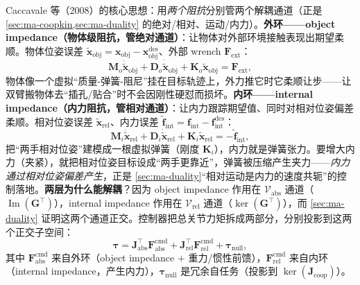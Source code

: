 Caccavale 等（2008）的核心思想\cite{caccavale2008sixdof}：用\emph{两个阻抗}分别管两个解耦通道（正是 \cref{sec:ma-coopkin,sec:ma-duality} 的绝对/相对、运动/内力）。\textbf{外环——object impedance（物体级阻抗，管绝对通道）}：让物体对外部环境接触表现出期望柔顺。物体位姿误差 $\tilde{\mathbf{x}}_{\text{obj}}=\mathbf{x}_{\text{obj}}-\mathbf{x}_{\text{obj}}^{\text{des}}$、外部 wrench $\mathbf{F}_{\text{ext}}$：
\begin{equation}
  \mathbf{M}_o\ddot{\tilde{\mathbf{x}}}_{\text{obj}}+\mathbf{D}_o\dot{\tilde{\mathbf{x}}}_{\text{obj}}+\mathbf{K}_o\tilde{\mathbf{x}}_{\text{obj}}=\mathbf{F}_{\text{ext}},
  \label{eq:ma-objimp}
\end{equation}
物体像一个虚拟“质量-弹簧-阻尼”挂在目标轨迹上，外力推它时它柔顺让步——让双臂搬物体去“插孔/贴合”时不会因刚性硬怼而损坏。\textbf{内环——internal impedance（内力阻抗，管相对通道）}：让内力跟踪期望值、同时对相对位姿偏差柔顺。相对位姿误差 $\tilde{\mathbf{x}}_{\text{rel}}$、内力误差 $\tilde{\mathbf{f}}_{\text{int}}=\mathbf{f}_{\text{int}}-\mathbf{f}_{\text{int}}^{\text{des}}$：
\begin{equation}
  \mathbf{M}_i\ddot{\tilde{\mathbf{x}}}_{\text{rel}}+\mathbf{D}_i\dot{\tilde{\mathbf{x}}}_{\text{rel}}+\mathbf{K}_i\tilde{\mathbf{x}}_{\text{rel}}=-\tilde{\mathbf{f}}_{\text{int}},
  \label{eq:ma-intimp}
\end{equation}
把“两手相对位姿”建模成一根虚拟弹簧（刚度 $\mathbf{K}_i$），内力就是弹簧张力。要增大内力（夹紧），就把相对位姿目标设成“两手更靠近”，弹簧被压缩产生夹力——\emph{内力通过相对位姿偏差产生}，正是 \cref{sec:ma-duality}“相对运动是内力的速度共轭”的控制落地。\textbf{两层为什么能解耦}？因为 object impedance 作用在 $\boldsymbol{\mathcal{V}}_{\text{abs}}$ 通道（$\operatorname{Im}(\mathbf{G}^\top)$），internal impedance 作用在 $\boldsymbol{\mathcal{V}}_{\text{rel}}$ 通道（$\ker(\mathbf{G}^\top)$），而 \cref{sec:ma-duality} 证明这两个通道正交。控制器把总关节力矩拆成两部分，分别投影到这两个正交子空间：
\begin{equation}
  \boldsymbol{\tau}=\mathbf{J}_{\text{abs}}^\top\mathbf{F}_{\text{abs}}^{\text{cmd}}+\mathbf{J}_{\text{rel}}^\top\mathbf{F}_{\text{rel}}^{\text{cmd}}+\boldsymbol{\tau}_{\text{null}},
  \label{eq:ma-tau-decomp}
\end{equation}
其中 $\mathbf{F}_{\text{abs}}^{\text{cmd}}$ 来自外环（object impedance $+$ 重力/惯性前馈），$\mathbf{F}_{\text{rel}}^{\text{cmd}}$ 来自内环（internal impedance，产生内力），$\boldsymbol{\tau}_{\text{null}}$ 是冗余自任务（投影到 $\ker(\mathbf{J}_{\text{coop}})$）。

